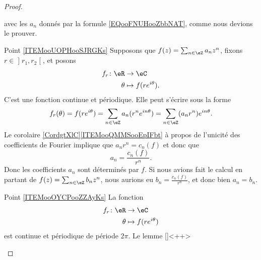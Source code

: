 \begin{proof}
\begin{subproof}
\begin{equation}
        \end{equation}
        avec les \( a_n\) donnés par la formule \eqref{EQooFNUHooZbbNAT}, comme nous devions le prouver.
    \item[Point \ref{ITEMooUOPHooSJRGKs}]
    Supposons que \( f(z)=\sum_{n\in \eZ}a_nz^n\), fixons \( r\in \mathopen] r_1 , r_2 \mathclose[\), et posons
        \begin{equation}
            \begin{aligned}
                f_r\colon \eR&\to \eC \\
                \theta&\mapsto f(r e^{i\theta}). 
            \end{aligned}
        \end{equation}
        C'est une fonction continue et périodique. Elle peut s'écrire sous la forme
        \begin{equation}
            f_r(\theta)=f(r e^{i\theta})=\sum_{n\in \eZ}a_n(r^n e^{in\theta})=\sum_{n\in \eZ}(a_nr^n) e^{in\theta}.
        \end{equation}
        Le corolaire \ref{CordgtXlC}\ref{ITEMooQMMSooEpIFbt} à propos de l'unicité des coefficients de Fourier implique que \( a_nr^n=c_n(f)\) et donc que
        \begin{equation}
            a_n=\frac{ c_n(f) }{ r^n }.
        \end{equation}
        Donc les coefficients \( a_n\) sont déterminés par \( f\). Si nous avions fait le calcul en partant de \( f(z)=\sum_{n\in \eZ}b_nz^n\), nous aurions eu \( b_n=\frac{ c_n(f) }{ r^n }\), et donc bien \( a_n=b_n\).
    \item[Point \ref{ITEMooOYCPooZZAyKs}]
        La fonction
        \begin{equation}
            \begin{aligned}
                f_r\colon \eR&\to \eC \\
                \theta&\mapsto f(r e^{i\theta}) 
            \end{aligned}
        \end{equation}
        est continue et périodique de période \( 2\pi\). Le lemme \ref{}<++>
        \end{subproof}
\end{proof}

